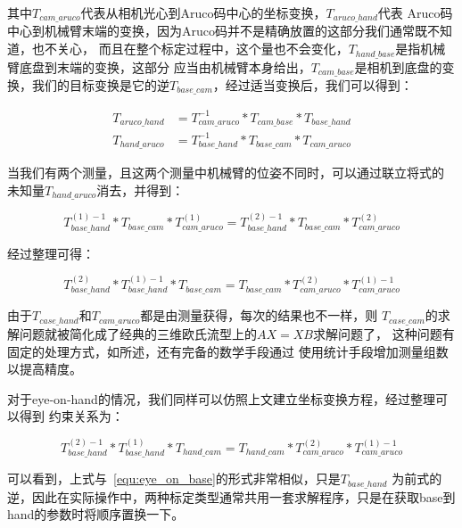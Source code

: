 其中$T_{cam\_aruco}$代表从相机光心到Aruco码中心的坐标变换，$T_{aruco\_hand}$代表
Aruco码中心到机械臂末端的变换，因为Aruco码并不是精确放置的这部分我们通常既不知道，也不关心，
而且在整个标定过程中，这个量也不会变化，$T_{hand\_base}$是指机械臂底盘到末端的变换，这部分
应当由机械臂本身给出，$T_{cam\_base}$是相机到底盘的变换，我们的目标变换是它的逆$T_{base\_cam}$，经过适当变换后，我们可以得到：

\begin{equation}
  \begin{aligned}
    T_{aruco\_hand} &= T_{cam\_aruco}^{-1} * T_{cam\_base} * T_{base\_hand} \\
    T_{hand\_aruco} &= T_{base\_hand}^{-1} * T_{base\_cam} * T_{cam\_aruco}
  \end{aligned}
\end{equation}

当我们有两个测量，且这两个测量中机械臂的位姿不同时，可以通过联立将式的
未知量$T_{hand\_aruco}$消去，并得到：

\begin{equation}
  T_{base\_hand}^{(1)-1} * T_{base\_cam} * T_{cam\_aruco}^{(1)} = 
  T_{base\_hand}^{(2)-1} * T_{base\_cam} * T_{cam\_aruco}^{(2)}
\end{equation}

经过整理可得：

\begin{equation}
  T_{base\_hand}^{(2)} * T_{base\_hand}^{(1) -1} * T_{base\_cam}= 
  T_{base\_cam} * T_{cam\_aruco}^{(2)}  * T_{cam\_aruco}^{(1) -1} 
\label{equ:eye_on_base}
\end{equation}

由于$T_{case\_hand}$和$T_{cam\_aruco}$都是由测量获得，每次的结果也不一样，则
$T_{case\_cam}$的求解问题就被简化成了经典的三维欧氏流型上的$AX = XB$求解问题了，
这种问题有固定的处理方式，如\cite{park1994robot}所述，还有完备的数学手段通过
使用统计手段增加测量组数以提高精度\cite{tsai1989new}。

对于eye-on-hand的情况，我们同样可以仿照上文建立坐标变换方程，经过整理可以得到
约束关系为：

\begin{equation}
  T_{base\_hand}^{(2) -1} * T_{base\_hand}^{(1)} * T_{hand\_cam}= 
  T_{hand\_cam} * T_{cam\_aruco}^{(2)}  * T_{cam\_aruco}^{(1) -1} 
\label{equ:eye_on_hand}
\end{equation}

可以看到，上式与~\ref{equ:eye_on_base}的形式非常相似，只是$T_{base\_hand}$
为前式的逆，因此在实际操作中，两种标定类型通常共用一套求解程序，只是在获取base到
hand的参数时将顺序置换一下。

